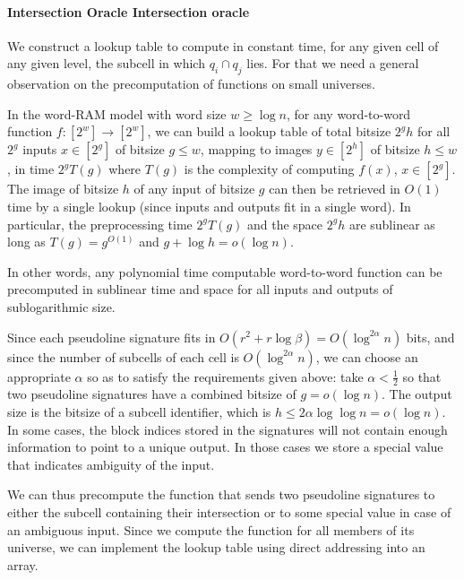 \paragraph*{\iftitlecase%
Intersection Oracle\else%
Intersection oracle\fi}
We construct a lookup table to compute in constant time,
for any given cell of any given level, the subcell in which \(q_i \cap q_j\)
lies.
For that we need a general observation on the precomputation of functions on
small universes.
%
\begin{observation}\label{obs:small-universe-functions}
  In the word-RAM model with word size \(w \geq \log n\), for any word-to-word
  function \(f:[2^w] \to [2^w]\), we can build a lookup table of total bitsize
  \(2^g h\) for all \(2^g\) inputs \(x \in [2^g]\) of bitsize \(g \leq w\),
  mapping to images \(y \in [2^h]\) of bitsize \(h \leq w\),
  in time \(2^g T(g)\) where \(T(g)\) is the complexity of computing \(f(x)\), 
  \(x \in [2^g]\). The image of bitsize \(h\) of any input of bitsize \(g\) can then be
  retrieved in \(O(1)\) time by a single lookup (since inputs and outputs fit in
  a single word). In particular, the preprocessing time \(2^g T(g)\) and the
  space \(2^g h\) are sublinear as long as \(T(g)=g^{O(1)}\) and \(g + \log h
  = o(\log n)\).
\end{observation}
%
In other words, any polynomial time computable word-to-word function can be
precomputed in sublinear time and space for all inputs and outputs of
sublogarithmic size.
%

Since each pseudoline signature fits in
\(O(r^2 + r \log \beta) = O(\log^{2\alpha}{n})\)
bits,
and since the number of subcells of each cell is \(O(\log^{2\alpha}{n})\),
we can choose an appropriate \(\alpha\) so as to satisfy the requirements given
above:
take \(\alpha < \frac 12\) so that two pseudoline signatures
have a combined bitsize of \(g = o(\log n)\).
The output size is the bitsize of a subcell identifier, which is \(h \leq 2
\alpha \log \log n = o(\log n)\).
%
In some cases, the block indices stored in the signatures will not contain
enough information to point to a unique output. In those cases we store a
special value that indicates ambiguity of the input.

We can thus precompute the function that sends two pseudoline
signatures to either the subcell containing their intersection or to some
special value in case of an ambiguous input. Since we compute the function for
all members of its universe, we can implement the lookup table using
direct addressing into an array.

